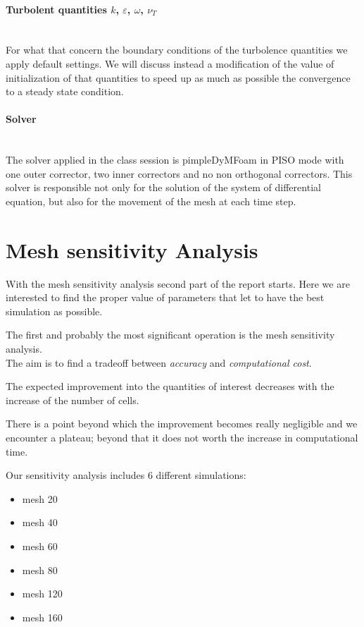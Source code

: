 \documentclass[a4paper,12pt]{article}
\begin{document}
\paragraph{Turbolent quantities $k$, $\varepsilon$, $\omega$, $\nu_T$}\mbox{}\\
For what that concern the boundary conditions of the turbolence quantities we apply default settings.
We will discuss instead a modification of the value of initialization of that quantities to speed up as much as possible the convergence to a steady state condition.

\paragraph{Solver}\mbox{}\\
The solver applied in the class session is pimpleDyMFoam in PISO mode with one outer corrector, two inner correctors and no non orthogonal correctors. This solver is responsible not only for the solution of the system of differential equation, but also for the movement of the mesh at each time step. 

\section{Mesh sensitivity Analysis}
With the mesh sensitivity analysis second part of the report starts. Here we are interested to find the proper value of parameters that let to have the best simulation as possible.

The first and probably the most significant operation is the mesh sensitivity analysis.
\\
The aim is to find a tradeoff between \emph{accuracy} and \emph{computational cost}. 

The expected improvement into the quantities of interest decreases with the increase of the number of cells.

There is a point beyond which the improvement becomes really negligible and we encounter a plateau; beyond that it does not worth the increase in computational time. 

Our sensitivity analysis includes 6 different simulations:
\begin{itemize}
\item mesh 20
\item mesh 40
\item mesh 60
\item mesh 80
\item mesh 120
\item mesh 160
\end{itemize}
\end{document}
